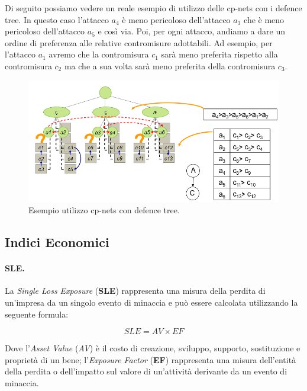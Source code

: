Di seguito possiamo vedere un reale esempio di utilizzo delle cp-nets con i defence tree. In questo caso l'attacco  \emph{\textbf{$a_4$}} è meno pericoloso dell'attacco \emph{\textbf{$a_3$}} che è meno pericoloso dell'attacco \emph{\textbf{$a_5$}} e così via. Poi, per ogni attacco, andiamo a dare un ordine di preferenza alle relative contromisure adottabili. Ad esempio, per l'attacco \emph{\textbf{$a_1$}} avremo che la contromisura \emph{\textbf{$c_1$}} sarà meno preferita rispetto alla contromisura \emph{\textbf{$c_2$}} ma che a sua volta sarà meno preferita della contromisura \emph{\textbf{$c_3$}}.

\begin{figure}[H]
	\centering
	\includegraphics[width=12cm, keepaspectratio]{capitoli/risks/imgs/cp-nets_con_defence_tree.png}
	\caption{Esempio utilizzo cp-nets con defence tree.}
	\label{fig:cp-nets_con_defence_tree}
\end{figure}

\subsection{Indici Economici}

\paragraph{SLE.}
La \textit{Single Loss Exposure} (\textbf{SLE}) rappresenta una misura della
perdita di un'impresa da un singolo
evento di minaccia e può essere calcolata utilizzando la seguente formula:

\[
    SLE = AV \times  EF
\]

Dove l'\textit{Asset Value} (\textit{AV}) è il costo di creazione, sviluppo,
supporto, sostituzione e proprietà di un bene;
l'\textit{Exposure Factor} (\textbf{EF}) rappresenta una misura dell'entità della
perdita o dell'impatto sul
valore di un'attività derivante da un evento di minaccia.

